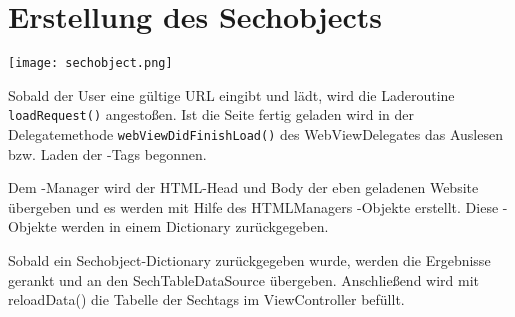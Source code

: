 \section{Erstellung des Sechobjects}

\texttt{[image: sechobject.png]}

Sobald der User eine gültige URL eingibt und lädt, wird die Laderoutine \Verb|loadRequest()|
angestoßen. Ist die Seite fertig geladen wird in der Delegatemethode \Verb|webViewDidFinishLoad()|
des WebViewDelegates das Auslesen bzw. Laden der \SEACH-Tags begonnen.

Dem \SEACH-Manager wird der HTML-Head und Body der eben geladenen Website übergeben und es
werden mit Hilfe des HTMLManagers \SEACH-Objekte erstellt. Diese \SEACH-Objekte werden in einem
Dictionary zurückgegeben.

Sobald ein Sechobject-Dictionary zurückgegeben wurde, werden die Ergebnisse gerankt und an den SechTableDataSource übergeben. Anschließend wird mit reloadData() die Tabelle der Sechtags im ViewController befüllt.
